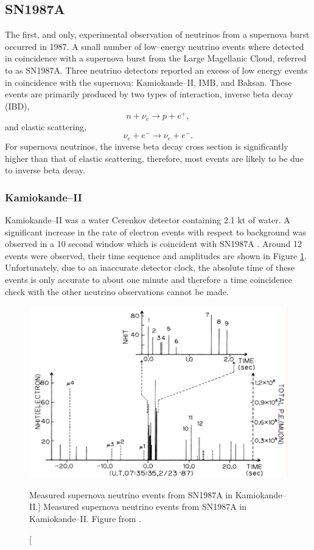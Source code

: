 \subsection{SN1987A}

The first, and only, experimental observation of neutrinos from a supernova
burst occurred in 1987. A small number of low--energy neutrino events where
detected in coincidence with a supernova burst from the Large Magellanic Cloud,
referred to as SN1987A. Three neutrino detectors reported an excess of low
energy events in coincidence with the supernova: Kamiokande--II, IMB, and 
Baksan. These events are primarily produced by two types of interaction, inverse
beta decay (IBD),
\begin{equation}
	n + \nu_e \rightarrow p + e^+,
\end{equation}
and elastic scattering,
\begin{equation}
	\nu_e + e^- \rightarrow \nu_e + e^-.
\end{equation}
For supernova neutrinos, the inverse beta decay cross section is significantly 
higher than that of elastic scattering, therefore, most events are likely to be
due to inverse beta decay.

\subsubsection{Kamiokande--II}
Kamiokande--II was a water Cerenkov detector containing 2.1 kt of water. A
significant increase in the rate of electron events with respect to background
was observed in a 10 second window which is coincident with SN1987A 
\cite{Hirata:1987hu}. Around 12 events were observed, their time sequence and
amplitudes are shown in Figure \ref{fig:kami_1987}. Unfortunately, due to an
inaccurate detector clock, the absolute time of these events is only accurate to
about one minute and therefore a time coincidence check with the other neutrino
observations cannot be made.

\begin{figure}
	\centering
	\includegraphics{figures/kami_1987.pdf}
	\caption
	[Measured supernova neutrino events from SN1987A in Kamiokande--II.]
	{Measured supernova neutrino events from SN1987A in Kamiokande--II. Figure
	from \cite{Hirata:1987hu}.}
	\label{fig:kami_1987}
\end{figure}

